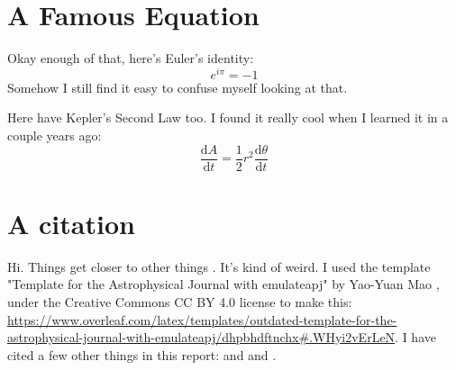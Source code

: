\documentclass[iop,apj,tighten]{emulateapj}
\begin{document}
\section{A Famous Equation}
Okay enough of that, here's Euler's identity:
\begin{equation}
e^{i\pi}=-1
\end{equation}
Somehow I still find it easy to confuse myself looking at that.

Here have Kepler's Second Law too. I found it really cool when I learned it in a couple years ago:
\begin{equation}
\frac{\text{d}A}{\text{d}t}=\frac{1}{2}r^2\frac{\text{d}\theta}{\text{d}t}
\end{equation}

\section{A citation}
Hi. Things get closer to other things \citep{newton1833philosophiae}. It's kind of weird. I used the template "Template for the Astrophysical Journal with emulateapj" by Yao-Yuan Mao \citep{website:template}, under the Creative Commons CC BY 4.0 license to make this: \url{https://www.overleaf.com/latex/templates/outdated-template-for-the-astrophysical-journal-with-emulateapj/dhpbhdftnchx#.WHyi2vErLeN}. I have cited a few other things in this report: \cite{2017arXiv170103096J} and \cite{opik1951collision} and \cite{wetherill1967collisions}.



\end{document}
